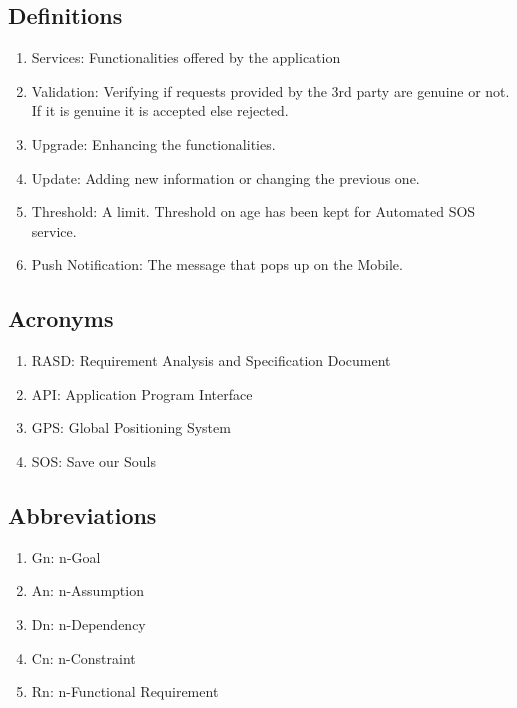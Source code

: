 \subsection{Definitions}
\begin{enumerate}
\item Services: Functionalities offered by the application
\item Validation: Verifying if requests provided by the 3rd party are genuine or not. If it is genuine it is accepted else rejected.
\item Upgrade: Enhancing the functionalities. 
\item Update: Adding new information or changing the previous one.
\item Threshold: A limit. Threshold on age has been kept for Automated SOS service.
\item Push Notification: The message that pops up on the Mobile. 
\end{enumerate}

\subsection{Acronyms}
\begin{enumerate}
\item RASD: Requirement Analysis and Specification Document
\item API: Application Program Interface
\item GPS: Global Positioning System
\item SOS: Save our Souls
\end{enumerate}

\subsection{Abbreviations}
\begin{enumerate}
\item Gn: n-Goal
\item An: n-Assumption
\item Dn: n-Dependency
\item Cn: n-Constraint
\item Rn: n-Functional Requirement 
\end{enumerate}
